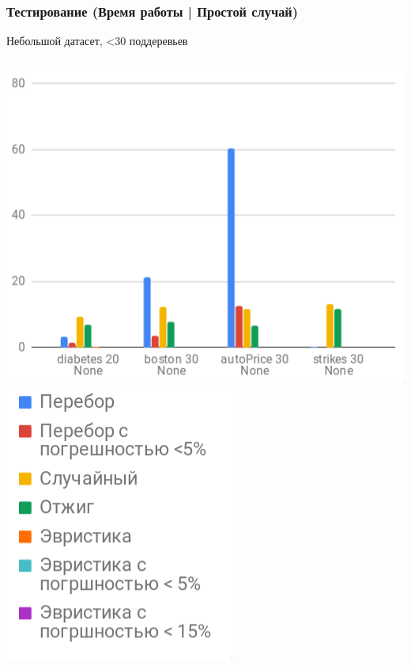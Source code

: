 \documentclass{beamer}
\begin{document}
\begin{frame} \frametitle{Тестирование (Время работы | Простой случай)}
    Небольшой датасет, <30 поддеревьев
    \vfill
    \begin{columns}
        \includegraphics[width=\textwidth]{time_easy.png}
        \includegraphics[width=\textwidth]{time_legend.png}
    \end{columns}
\end{frame}
\end{document}
